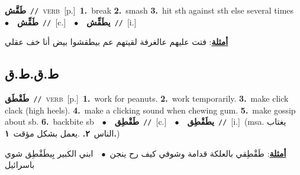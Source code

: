 \documentclass[10pt,a4paper,twoside]{article} %
\begin{document}
\begin{multicols}{2}
{\setlength\topsep{0pt}\textbf{\foreignlanguage{arabic}{طَقَّش}}\ {\color{gray}\texttt{//}\color{black}}\ \textsc{verb}\ [p.]\ \textbf{1.}~break  \textbf{2.}~smash  \textbf{3.}~hit sth against sth else several times\ \ $\bullet$\ \ \setlength\topsep{0pt}\textbf{\foreignlanguage{arabic}{طَقِّش}}\ {\color{gray}\texttt{//}\color{black}}\ [c.]\ \ $\bullet$\ \ \setlength\topsep{0pt}\textbf{\foreignlanguage{arabic}{يطَقِّش}}\ {\color{gray}\texttt{//}\color{black}}\ [i.]\  \begin{flushright}\color{gray}\foreignlanguage{arabic}{\textbf{\underline{\foreignlanguage{arabic}{أمثلة}}}: فتت عليهم عالغرفة لقيتهم عم بيطقشوا بيض أنا خف عقلي}\end{flushright}\color{black}} \vspace{2mm}

\vspace{-3mm}
\subsection*{\color{blue}\foreignlanguage{arabic}{ط.ق.ط.ق}\color{blue}{}} 

{\setlength\topsep{0pt}\textbf{\foreignlanguage{arabic}{طَقْطَق}}\ {\color{gray}\texttt{//}\color{black}}\ \textsc{verb}\ [p.]\ \textbf{1.}~work for peanuts.  \textbf{2.}~work temporarily.  \textbf{3.}~make click clack (high heels).  \textbf{4.}~make a clicking sound when chewing gum.  \textbf{5.}~make gossip about sb.  \textbf{6.}~backbite sb\ \ $\bullet$\ \ \setlength\topsep{0pt}\textbf{\foreignlanguage{arabic}{طَقْطِق}}\ {\color{gray}\texttt{//}\color{black}}\ [c.]\ \ $\bullet$\ \ \setlength\topsep{0pt}\textbf{\foreignlanguage{arabic}{يطَقْطِق}}\ {\color{gray}\texttt{//}\color{black}}\ [i.]\ \color{gray}(msa. \foreignlanguage{arabic}{يغتاب الناس}~\foreignlanguage{arabic}{\textbf{٢.}}  .\foreignlanguage{arabic}{يعمل بشكل مؤقت}~\foreignlanguage{arabic}{\textbf{١.}})\color{black}\  \begin{flushright}\color{gray}\foreignlanguage{arabic}{\textbf{\underline{\foreignlanguage{arabic}{أمثلة}}}: طَقْطِقي بالعلكة قدامة وشوفي كيف رح ينجن\ $\bullet$\ \  ابني الكبير بِيطَقْطِق شوي باسرائيل}\end{flushright}\color{black}} \vspace{2mm}


\end{multicols}
\end{document}
